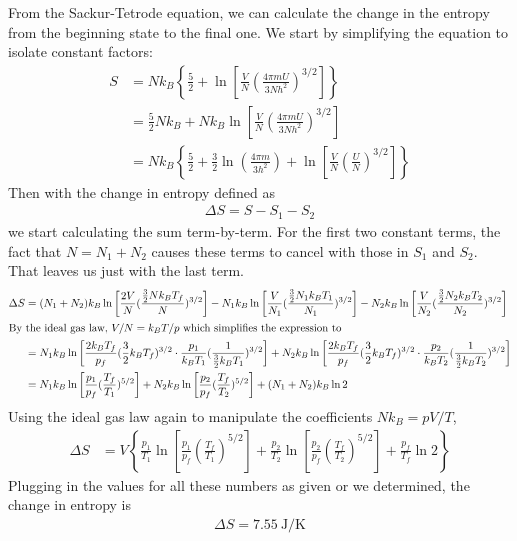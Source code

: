 From the Sackur-Tetrode equation, we can calculate the change in the entropy
from the beginning state to the final one. We start by simplifying the
equation to isolate constant factors:
\begin{align*}
    S &= Nk_B \left\{\frac 52 + \ln\left[ \frac{V}{N}
		(\frac{4{\pi} mU}{3Nh^2})^{3/2} \right] \right\} \\
    {} &= \frac 52 Nk_B + Nk_B \ln\left[ \frac{V}{N}
		(\frac{4{\pi} mU}{3Nh^2})^{3/2} \right] \\
    {} &= Nk_B \left\{ \frac 52 + \frac 32 \ln(\frac{4{\pi} m}{3h^2})
        + \ln\left[ \frac{V}{N}(\frac{U}{N})^{3/2} \right] \right\}
\end{align*}
Then with the change in entropy defined as
\begin{align*}
    \Delta S = S - S_1 - S_2
\end{align*}
we start calculating the sum term-by-term. For the first two constant terms,
the fact that $N = N_1 + N_2$ causes these terms to cancel with those in $S_1$
and $S_2$. That leaves us just with the last term.
\begin{align*}
    \Delta S &= (N_1+N_2)k_B
        \ln\left[\frac{2V}{N}(\frac{\frac 32 Nk_B T_f}{N})^{3/2}\right]
        - N_1k_B\ln\left[\frac{V}{N_1}(\frac{\frac 32 N_1k_B T_1}{N_1})^{3/2}\right]
        - N_2k_B\ln\left[\frac{V}{N_2}(\frac{\frac 32 N_2k_B T_2}{N_2})^{3/2}\right]
    \\
\intertext{By the ideal gas law, $V/N = k_BT/p$ which simplifies the expression
to}
    {} &= N_1k_B\ln\left[
            \frac{2k_B T_f}{p_f}(\frac 32 k_B T_f)^{3/2} \cdot 
            \frac{p_1}{k_B T_1}(\frac{1}{\frac 32 k_B T_1})^{3/2}
        \right] + N_2k_B\ln\left[
            \frac{2k_B T_f}{p_f}(\frac 32 k_B T_f)^{3/2} \cdot 
            \frac{p_2}{k_B T_2}(\frac{1}{\frac 32 k_B T_2})^{3/2}
        \right]
    \\
    {} &= N_1k_B\ln\left[
            \frac{p_1}{p_f}(\frac{T_f}{T_1})^{5/2}
        \right] + N_2k_B\ln\left[
            \frac{p_2}{p_f}(\frac{T_f}{T_2})^{5/2}
        \right] + (N_1+N_2)k_B \ln 2
\end{align*}
Using the ideal gas law again to manipulate the coefficients $Nk_B = pV/T$,
\begin{align*}
    \Delta S &= V\left\{ \frac{p_1}{T_1}\ln\left[
            \frac{p_1}{p_f}(\frac{T_f}{T_1})^{5/2}
        \right] + \frac{p_2}{T_2}\ln\left[
            \frac{p_2}{p_f}(\frac{T_f}{T_2})^{5/2}
        \right] + \frac{p_f}{T_f} \ln 2 \right\}
\end{align*}
Plugging in the values for all these numbers as given or we determined, the
change in entropy is
\begin{align}
    \boxed{ \Delta S = \SI{7.55}{\J/\K} }
\end{align}

